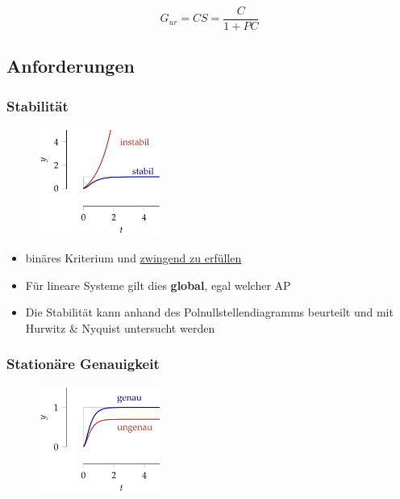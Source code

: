 \documentclass[
  10pt,
  a4paper,
  twocolumn]{article}
\providecommand{\tightlist}{%
  \setlength{\itemsep}{0pt}\setlength{\parskip}{0pt}}\usepackage{longtable,booktabs,array}
\numberwithin{equation}{section}
\begin{document}
\[
G_{ur} = CS = \frac{C}{1+PC} 
\]

\hypertarget{anforderungen}{%
\subsection{Anforderungen}\label{anforderungen}}

\hypertarget{stabilituxe4t-1}{%
\subsubsection{Stabilität}\label{stabilituxe4t-1}}

\begin{figure}[H]

{\centering \includegraphics[width=4cm,height=3.5cm]{images/paste-11.png}

}

\end{figure}

\begin{itemize}
\tightlist
\item
  binäres Kriterium und \ul{zwingend zu erfüllen}
\item
  Für lineare Systeme gilt dies \textbf{global}, egal welcher AP
\item
  Die Stabilität kann anhand des Polnullstellendiagramms beurteilt und
  mit Hurwitz \& Nyquist untersucht werden
\end{itemize}

\hypertarget{stationuxe4re-genauigkeit}{%
\subsubsection{Stationäre Genauigkeit}\label{stationuxe4re-genauigkeit}}

\begin{figure}[H]

{\centering \includegraphics[width=4cm,height=3.5cm]{images/paste-12.png}

}

\end{figure}
\end{document}

